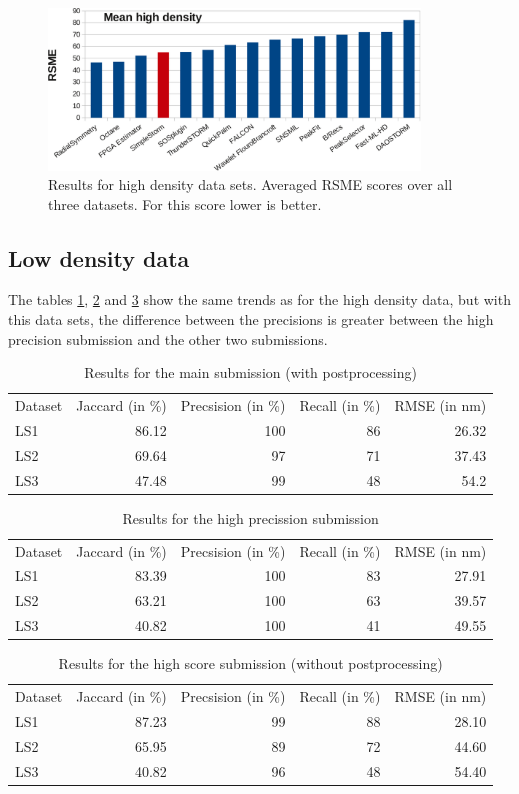\begin{figure}
\centering
\includegraphics[width = 0.88\textwidth]{pictures/diagrammsChallenge/MeanHighDensityRSMECropped.pdf}
	\caption{Results for high density data sets. Averaged RSME scores over all three datasets. For this score lower is better.}
	\label{meanRSMEHighDensity}
\end{figure}

\subsection{Low density data}
The tables \ref{resls1}, \ref{resls2} and \ref{resls3} show the same trends as for the high density data, but with this data sets, the difference between the precisions is greater between the high precision submission and the other two submissions.
\begin{table}
\caption{Results for the main submission (with postprocessing)}
\begin{tabular}{lrrrr}
Dataset&Jaccard (in \%)&Precsision (in \%)& Recall (in \%) & RMSE (in nm)\\
LS1&86.12&100&86&26.32\\
LS2&69.64&97&71&37.43\\
LS3&47.48&99&48&54.2
\end{tabular}\label{resls1}
\end{table}


\begin{table}
\caption{Results for the high precission submission}
\begin{tabular}{lrrrr}
Dataset&Jaccard (in \%)&Precsision (in \%)& Recall (in \%) & RMSE (in nm)\\
LS1&83.39&100&83&27.91\\
LS2&63.21&100&63&39.57\\
LS3&40.82&100&41&49.55
\end{tabular}\label{resls2}
\end{table}
\begin{table}
\caption{Results for the high score submission (without postprocessing)}
\begin{tabular}{lrrrr}
Dataset&Jaccard (in \%)&Precsision (in \%)& Recall (in \%) & RMSE (in nm)\\
LS1&87.23&99&88&28.10\\
LS2&65.95&89&72&44.60\\
LS3&40.82&96&48&54.40
\end{tabular}\label{resls3}
\end{table}


